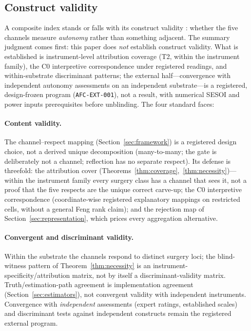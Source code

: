 \subsection{Construct validity}\label{sec:construct}

A composite index stands or falls with its construct validity
\citep{oecd2008}: whether the five channels measure \emph{autonomy} rather than
something adjacent. The summary judgment comes first: this paper does \emph{not}
establish construct validity. What is established is instrument-level
attribution coverage (T2, within the instrument family), the C0 interpretive
correspondence under registered readings, and within-substrate discriminant
patterns; the external half---convergence with independent autonomy assessments
on an independent substrate---is a registered, design-frozen program
(\texttt{AFC-EXT-001}), not a result, with numerical SESOI and power inputs
prerequisites before unblinding. The four standard faces:

\paragraph{Content validity.} The channel--respect mapping
(Section~\ref{sec:framework}) is a registered design choice, not a derived
unique decomposition (many-to-many; the gate is deliberately not a channel;
reflection has no separate respect). Its defense is threefold: the attribution
cover (Theorems~\ref{thm:coverage},~\ref{thm:necessity})---within the instrument
family every surgery class has a channel that sees it, not a proof that the five
respects are the unique correct carve-up; the C0 interpretive correspondence
(coordinate-wise registered explanatory mappings on restricted cells, without a
general Feng rank claim); and the rejection map of
Section~\ref{sec:representation}, which prices every aggregation alternative.

\paragraph{Convergent and discriminant validity.} Within the substrate the
channels respond to distinct surgery loci; the blind-witness pattern of
Theorem~\ref{thm:necessity} is an instrument-specificity/attribution matrix, not
by itself a discriminant-validity matrix. Truth/estimation-path agreement is
implementation agreement (Section~\ref{sec:estimators}), not convergent validity
with independent instruments. Convergence with \emph{independent} assessments
(expert ratings, established scales) and discriminant tests against independent
constructs remain the registered external program.

